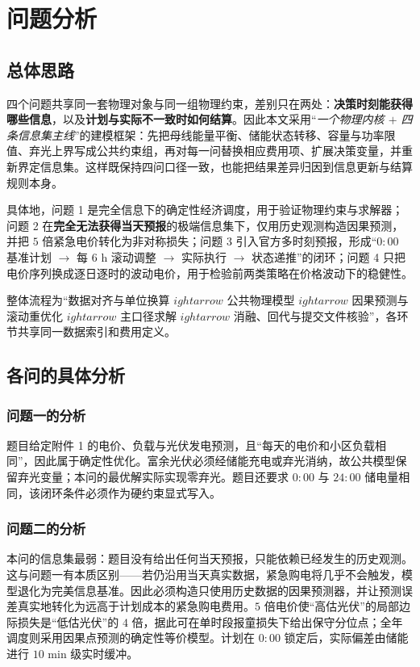 \section{问题分析}

\subsection{总体思路}

四个问题共享同一套物理对象与同一组物理约束，差别只在两处：\textbf{决策时刻能获得哪些信息}，以及\textbf{计划与实际不一致时如何结算}。因此本文采用“\emph{一个物理内核 $+$ 四条信息集主线}”的建模框架：先把母线能量平衡、储能状态转移、容量与功率限值、弃光上界写成公共约束组，再对每一问替换相应费用项、扩展决策变量，并重新界定信息集。这样既保持四问口径一致，也能把结果差异归因到信息更新与结算规则本身。

具体地，问题 1 是完全信息下的确定性经济调度，用于验证物理约束与求解器；问题 2 在\textbf{完全无法获得当天预报}的极端信息集下，仅用历史观测构造因果预测，并把 $5$ 倍紧急电价转化为非对称损失；问题 3 引入官方多时刻预报，形成“$0{:}00$ 基准计划 $\rightarrow$ 每 $6$ h 滚动调整 $\rightarrow$ 实际执行 $\rightarrow$ 状态递推”的闭环；问题 4 只把电价序列换成逐日逐时的波动电价，用于检验前两类策略在价格波动下的稳健性。

整体流程为“数据对齐与单位换算 $
ightarrow$ 公共物理模型 $
ightarrow$ 因果预测与滚动重优化 $
ightarrow$ 主口径求解 $
ightarrow$ 消融、回代与提交文件核验”，各环节共享同一数据索引和费用定义。

\subsection{各问的具体分析}

\subsubsection*{问题一的分析}

题目给定附件 1 的电价、负载与光伏发电预测，且“每天的电价和小区负载相同”，因此属于确定性优化。富余光伏必须经储能充电或弃光消纳，故公共模型保留弃光变量；本问的最优解实际实现零弃光。题目还要求 $0{:}00$ 与 $24{:}00$ 储电量相同，该闭环条件必须作为硬约束显式写入。

\subsubsection*{问题二的分析}

本问的信息集最弱：题目没有给出任何当天预报，只能依赖已经发生的历史观测。这与问题一有本质区别——若仍沿用当天真实数据，紧急购电将几乎不会触发，模型退化为完美信息基准。因此必须构造只使用历史数据的因果预测器，并让预测误差真实地转化为远高于计划成本的紧急购电费用。$5$ 倍电价使“高估光伏”的局部边际损失是“低估光伏”的 $4$ 倍，据此可在单时段报童损失下给出保守分位点；全年调度则采用因果点预测的确定性等价模型。计划在 $0{:}00$ 锁定后，实际偏差由储能进行 $10$ min 级实时缓冲。

